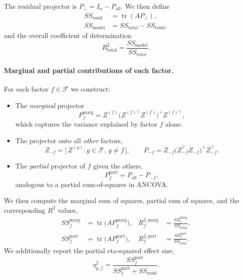 The residual projector is $P_\perp = I_n - P_{\text{all}}$. We then define
\begin{align}
    SS_{\text{resid}} &= \operatorname{tr}(A P_\perp), \\
    SS_{\text{model}} &= SS_{\text{total}} - SS_{\text{resid}},
\end{align}
and the overall coefficient of determination
\begin{equation}
    R^2_{\text{total}} = \frac{SS_{\text{model}}}{SS_{\text{total}}}.
\end{equation}

\paragraph{Marginal and partial contributions of each factor.}
For each factor $f \in \mathcal{F}$ we construct:

\begin{itemize}
    \item The \emph{marginal} projector
    \begin{equation}
        P_f^{\text{marg}} = Z^{(f)} \big(Z^{(f)\top} Z^{(f)}\big)^+ Z^{(f)\top},
    \end{equation}
    which captures the variance explained by factor $f$ alone.
    
    \item The projector onto all \emph{other} factors,
    \begin{equation}
        Z_{-f} = \big[\,Z^{(g)} : g \in \mathcal{F},\, g \neq f\,\big], \qquad
        P_{-f} = Z_{-f} \big(Z_{-f}^\top Z_{-f}\big)^+ Z_{-f}^\top.
    \end{equation}
    
    \item The \emph{partial} projector of $f$ given the others,
    \begin{equation}
        P_f^{\text{part}} = P_{\text{all}} - P_{-f},
    \end{equation}
    analogous to a partial sum-of-squares in ANCOVA.
\end{itemize}

We then compute the marginal sum of squares, partial sum of squares, and the corresponding $R^2$ values,
\begin{align}
    SS_f^{\text{marg}} &= \operatorname{tr}\!\big(A P_f^{\text{marg}}\big), &
    R_f^{2,\text{marg}} &= \frac{SS_f^{\text{marg}}}{SS_{\text{total}}}, \\
    SS_f^{\text{part}} &= \operatorname{tr}\!\big(A P_f^{\text{part}}\big), &
    R_f^{2,\text{part}} &= \frac{SS_f^{\text{part}}}{SS_{\text{total}}}.
\end{align}
We additionally report the partial eta-squared effect size,
\begin{equation}
    \eta_{p,f}^2 = 
    \frac{SS_f^{\text{part}}}{SS_f^{\text{part}} + SS_{\text{resid}}}.
\end{equation}

